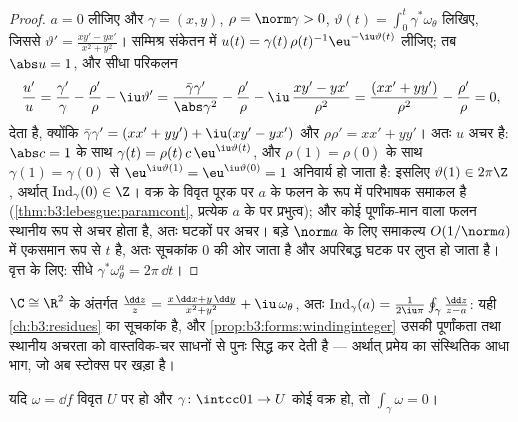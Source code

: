 \begin{proof}
$a = 0$ लीजिए और $\gamma = (x, y)$, $\rho =
\norm\gamma > 0$, $\vartheta(t) =
\int_0^t\gamma^*\omega_\theta$ लिखिए, जिससे $\vartheta' =
\frac{xy' - yx'}{x^2 + y^2}$।
सम्मिश्र संकेतन में $u(t)
= \gamma(t)\,\rho(t)^{-1}\eu^{-\iu\vartheta(t)}$ लीजिए; तब $\abs u = 1$, और सीधा परिकलन
\[
\frac{u'}{u} = \frac{\gamma'}{\gamma} - \frac{\rho'}{\rho}
- \iu\vartheta'
= \frac{\bar\gamma\gamma'}{\abs\gamma^2} -
\frac{\rho'}{\rho} - \iu\,\frac{xy' -
yx'}{\rho^2}
= \frac{(xx' + yy')}{\rho^2} - \frac{\rho'}{\rho} = 0,
\]
देता है, क्योंकि $\bar\gamma\gamma' = (xx' + yy') + \iu(xy' - yx')$ और $\rho\rho' = xx' + yy'$। अतः $u$ अचर है: $\abs c = 1$ के साथ
$\gamma(t) =
\rho(t)\,c\,\eu^{\iu\vartheta(t)}$, और $\rho(1) = \rho(0)$ के साथ $\gamma(1) = \gamma(0)$ से $\eu^{\iu\vartheta(1)} = \eu^{\iu\vartheta(0)} = 1$ अनिवार्य हो जाता है:
इसलिए $\vartheta(1) \in 2\pi\Z$, अर्थात् $\operatorname{Ind}_\gamma(0) \in \Z$।  वक्र के विवृत पूरक पर $a$ के
फलन के रूप में परिभाषक समाकल  है (\cref{thm:b3:lebesgue:paramcont}, प्रत्येक $a$ के
 पर प्रभुत्व); और कोई  पूर्णांक-मान वाला फलन स्थानीय
रूप से अचर होता है, अतः घटकों पर अचर। बड़े $\norm a$ के लिए समाकल्य
$O(1/\norm a)$ में एकसमान रूप से $t$ है, अतः सूचकांक $0$ की ओर जाता है
और अपरिबद्ध घटक पर लुप्त हो जाता है। वृत्त के लिए: सीधे $\gamma^*\omega_\theta^a = 2\pi\,\dd t$।
\end{proof}

\begin{remark}
$\C \cong \R^2$ के अंतर्गत $\frac{\dd z}{z} = \frac{x\,\dd x +
y\,\dd y}{x^2 + y^2} + \iu\,\omega_\theta$, अतः $\operatorname{Ind}_\gamma(a) =
\frac1{2\iu\pi}\oint_\gamma\frac{\dd z}{z - a}$: यही \cref{ch:b3:residues} का सूचकांक है, और
\cref{prop:b3:forms:windinginteger} उसकी पूर्णांकता तथा स्थानीय अचरता को वास्तविक-चर साधनों से
पुनः सिद्ध कर देती है --- अर्थात्  प्रमेय का संस्थितिक आधा
भाग, जो अब स्टोक्स पर खड़ा है।
\end{remark}

\begin{proposition}\label{prop:b3:forms:exactloop}
यदि $\omega = \dd f$ विवृत $U$ पर  हो और $\gamma\colon\intcc01\to U$ कोई  वक्र हो, तो
$\int_\gamma\omega = 0$।
\end{proposition}

